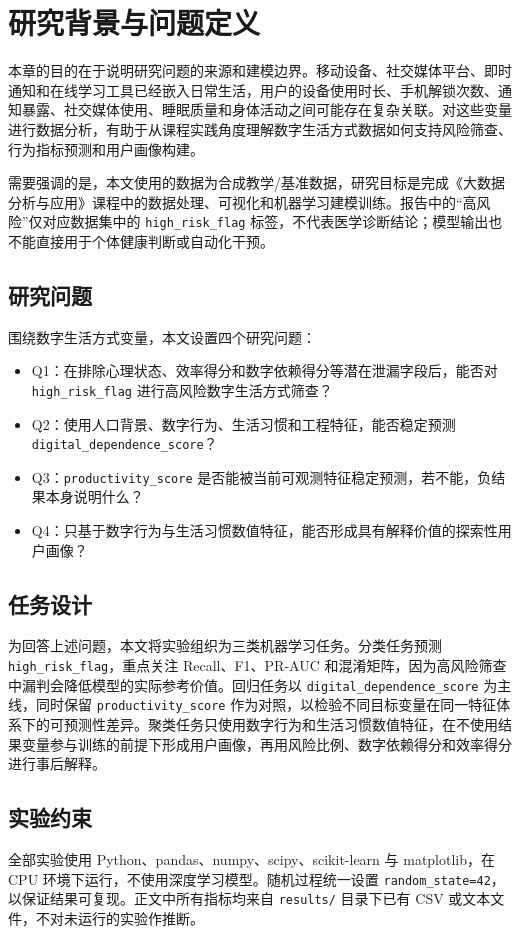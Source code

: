 \section{研究背景与问题定义}

本章的目的在于说明研究问题的来源和建模边界。移动设备、社交媒体平台、即时通知和在线学习工具已经嵌入日常生活，用户的设备使用时长、手机解锁次数、通知暴露、社交媒体使用、睡眠质量和身体活动之间可能存在复杂关联。对这些变量进行数据分析，有助于从课程实践角度理解数字生活方式数据如何支持风险筛查、行为指标预测和用户画像构建。

需要强调的是，本文使用的数据为合成教学/基准数据，研究目标是完成《大数据分析与应用》课程中的数据处理、可视化和机器学习建模训练。报告中的“高风险”仅对应数据集中的 \texttt{high\_risk\_flag} 标签，不代表医学诊断结论；模型输出也不能直接用于个体健康判断或自动化干预。

\subsection{研究问题}

围绕数字生活方式变量，本文设置四个研究问题：

\begin{itemize}
  \item Q1：在排除心理状态、效率得分和数字依赖得分等潜在泄漏字段后，能否对 \texttt{high\_risk\_flag} 进行高风险数字生活方式筛查？
  \item Q2：使用人口背景、数字行为、生活习惯和工程特征，能否稳定预测 \texttt{digital\_dependence\_score}？
  \item Q3：\texttt{productivity\_score} 是否能被当前可观测特征稳定预测，若不能，负结果本身说明什么？
  \item Q4：只基于数字行为与生活习惯数值特征，能否形成具有解释价值的探索性用户画像？
\end{itemize}

\subsection{任务设计}

为回答上述问题，本文将实验组织为三类机器学习任务。分类任务预测 \texttt{high\_risk\_flag}，重点关注 Recall、F1、PR-AUC 和混淆矩阵，因为高风险筛查中漏判会降低模型的实际参考价值。回归任务以 \texttt{digital\_dependence\_score} 为主线，同时保留 \texttt{productivity\_score} 作为对照，以检验不同目标变量在同一特征体系下的可预测性差异。聚类任务只使用数字行为和生活习惯数值特征，在不使用结果变量参与训练的前提下形成用户画像，再用风险比例、数字依赖得分和效率得分进行事后解释。

\subsection{实验约束}

全部实验使用 Python、pandas、numpy、scipy、scikit-learn 与 matplotlib，在 CPU 环境下运行，不使用深度学习模型。随机过程统一设置 \texttt{random\_state=42}，以保证结果可复现。正文中所有指标均来自 \texttt{results/} 目录下已有 CSV 或文本文件，不对未运行的实验作推断。
